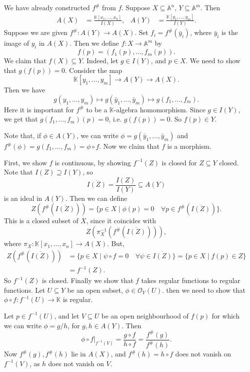 \documentclass[12pt]{article}
\begin{document}
\begin{proofbox}
	We have already constructed $f^{\#}$ from $f$. Suppose $X \subseteq \mathbb{A}^n$, $Y \subseteq \mathbb{A}^m$. Then
	\begin{align*}
		A(X) &= \frac{\mathbb{K}[x_1, \ldots, x_n]}{I(X)}, & A(Y) &= \frac{\mathbb{K}[y_1, \ldots, y_m]}{I(Y)}.
	\end{align*}
	Suppose we are given $f^{\#} : A(Y) \to A(X)$. Set $f_i = f^{\#}(\bar y_i)$, where $\bar y_i$ is the image of $y_i$ in $A(X)$. Then we define $f : X \to \mathbb{A}^m$ by
	\[
	f(p) = (f_1(p), \ldots, f_m(p)).
	\]
	We claim that $f(X) \subseteq Y$. Indeed, let $g \in I(Y)$, and $p \in X$. We need to show that $g(f(p)) = 0$. Consider the map
	\[
		\mathbb{K}[y_1, \ldots, y_m] \to A(Y) \to A(X).
	\]
	Then we have
	\[
		g(y_1, \ldots, y_m) \mapsto g(\bar y_1, \ldots, \bar y_m) \mapsto g(f_1, \ldots, f_m).
	\]
	Here it is important for $f^{\#}$ to be a $\mathbb{K}$-algebra homomorphism. Since $g \in I(Y)$, we get that $g(f_1, \ldots, f_m)(p) = 0$, i.e. $g(f(p)) = 0$. So $f(p) \in Y$.

	Note that, if $\phi \in A(Y)$, we can write $\phi = g(\bar y_1, \ldots, \bar y_m)$ and $f^{\#}(\phi) = g(f_1, \ldots, f_m) = \phi \circ f$. Now we claim that $f$ is a morphism.

	First, we show $f$ is continuous, by showing $f^{-1}(Z)$ is closed for $Z \subseteq Y$ closed. Note that $I(Z) \supseteq I(Y)$, so
	\[
	\overline{I(Z)} = \frac{I(Z)}{I(Y)} \subseteq A(Y)
	\]
	is an ideal in $A(Y)$. Then we can define
	\[
		Z(f^{\#}(\overline{I(Z)})) = \{p \in X \mid \phi(p) = 0 \quad \forall p \in f^{\#}(\overline{I(Z)})\}.
	\]
	This is a closed subset of $X$, since it coincides with
	\[
	Z(\pi_X^{-1}(f^{\#}(\overline{I(Z)}))),
	\]
	where $\pi_X : \mathbb{K}[x_1, \ldots, x_n] \to A(X)$. But,
	\begin{align*}
		Z(f^{\#}(\overline{I(Z)})) &= \{p \in X \mid \psi \circ f = 0 \quad \forall\psi \in \overline{I(Z)}\} = \{p \in X \mid f(p) \in Z\} \\
					   &= f^{-1}(Z).
	\end{align*}
	So $f^{-1}(Z)$ is closed.
	Finally we show that $f$ takes regular functions to regular functions. Let $U \subseteq Y$ be an open subset, $\phi \in \mathcal{O}_Y(U)$. then we need to show that $\phi \circ f : f^{-1}(U) \to \mathbb{K}$ is regular.

	Let $p \in f^{-1}(U)$, and let $V \subseteq U$ be an open neighbourhood of $f(p)$ for which we can write $\phi = g/h$, for $g, h \in A(Y)$. Then
	\[
	\phi \circ f|_{f^{-1}(V)} = \frac{g \circ f}{h \circ f} = \frac{f^{\#}(g)}{f^{\#}(h)}.
	\]
	Now $f^{\#}(g), f^{\#}(h)$ lie in $A(X)$, and $f^{\#}(h) = h \circ f$ does not vanish on $f^{-1}(V)$, as $h$ does not vanish on $V$.
\end{proofbox}
\end{document}
